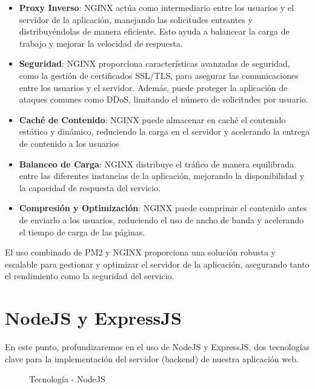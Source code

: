 \begin{itemize}

  \item \textbf{Proxy Inverso}: NGINX actúa como intermediario entre los usuarios y el servidor de la aplicación, manejando las solicitudes entrantes y distribuyéndolas de manera eficiente. Esto ayuda a balancear la carga de trabajo y mejorar la velocidad de respuesta.
  
  \item \textbf{Seguridad}: NGINX proporciona características avanzadas de seguridad, como la gestión de certificados SSL/TLS, para asegurar las comunicaciones entre los usuarios y el servidor. Además, puede proteger la aplicación de ataques comunes como DDoS, limitando el número de solicitudes por usuario.
  
  \item \textbf{Caché de Contenido}: NGINX puede almacenar en caché el contenido estático y dinámico, reduciendo la carga en el servidor y acelerando la entrega de contenido a los usuarios
  
  \item \textbf{Balanceo de Carga}: NGINX distribuye el tráfico de manera equilibrada entre las diferentes instancias de la aplicación, mejorando la disponibilidad y la capacidad de respuesta del servicio.
  
  \item \textbf{Compresión y Optimización}: NGINX puede comprimir el contenido antes de enviarlo a los usuarios, reduciendo el uso de ancho de banda y acelerando el tiempo de carga de las páginas.

\end{itemize}

El uso combinado de PM2 y NGINX proporciona una solución robusta y escalable para gestionar y optimizar el servidor de la aplicación, asegurando tanto el rendimiento como la seguridad del servicio.

\newpage

\section{NodeJS y ExpressJS}

En este punto, profundizaremos en el uso de NodeJS y ExpressJS, dos tecnologías clave para la implementación del servidor (backend) de nuestra aplicación web.

\begin{figure}[h]
\centering
 \caption{Tecnología - NodeJS}
\end{figure}

